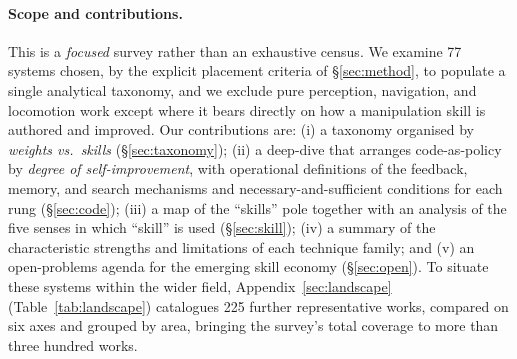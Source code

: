 \documentclass[acmsmall,review,anonymous]{acmart}
\begin{document}
\paragraph{Scope and contributions.}
This is a \emph{focused} survey rather than an exhaustive census. We examine 77 systems chosen,
by the explicit placement criteria of \S\ref{sec:method}, to populate a single analytical
taxonomy, and we exclude pure perception, navigation, and
locomotion work except where it bears directly on how a manipulation skill is authored and
improved. Our contributions are: (i) a taxonomy organised by \emph{weights vs.\ skills}
(\S\ref{sec:taxonomy}); (ii) a deep-dive that arranges code-as-policy by \emph{degree of
self-improvement}, with operational definitions of the feedback, memory, and search mechanisms
and necessary-and-sufficient conditions for each rung (\S\ref{sec:code}); (iii) a map of the
``skills'' pole together with an analysis of the five senses in which ``skill'' is used
(\S\ref{sec:skill}); (iv) a summary of the characteristic strengths and limitations of each
technique family; and (v) an open-problems agenda for the emerging skill economy
(\S\ref{sec:open}). To situate these systems within the wider field,
Appendix~\ref{sec:landscape} (Table~\ref{tab:landscape}) catalogues 225 further representative
works, compared on six axes and grouped by area, bringing the survey's total coverage to more than
three hundred works.
\end{document}

